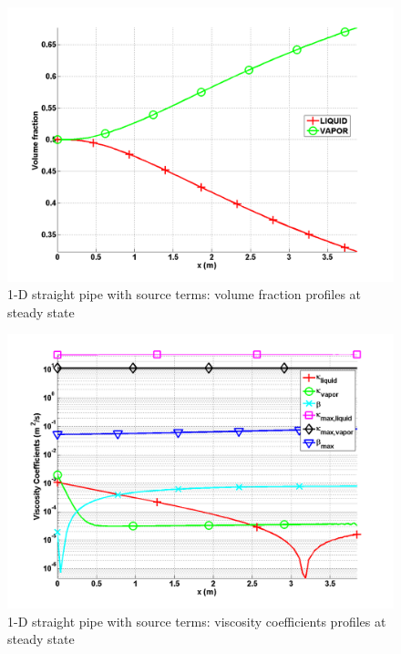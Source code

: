        \begin{figure}[H]
                \centering
                \includegraphics[width=\textwidth]{figures/SEM/ANS_WINTER_2014_7Eqn_volume_fraction.png}
                \caption{1-D straight pipe with source terms: volume fraction profiles at steady state}
                \label{fig:volume_fraction}
        \end{figure}        
%
        \begin{figure}[H]
                \centering
                \includegraphics[width=\textwidth]{figures/SEM/ANS_WINTER_2014_7Eqn_viscosity.png}
                \caption{1-D straight pipe with source terms: viscosity coefficients profiles at steady state}
                \label{fig:viscosity_coeff}
        \end{figure}        
